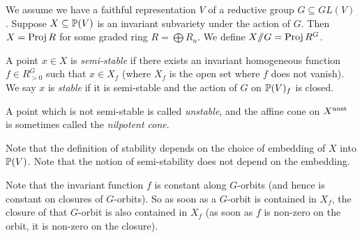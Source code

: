 
We assume we have a faithful representation $V$ of a reductive group $G\subseteq GL(V)$. Suppose $X\subseteq \mathbb{P}(V)$ is an invariant subvariety under the action of $G$. Then $X=\operatorname{Proj} R$ for some graded ring $R=\bigoplus R_n$. We define $X\mbox{\rm /\!\!/} G = \operatorname{Proj} R^G$.

\begin{definition}
 A point $x\in X$ is \emph{semi-stable} if there exists an invariant homogeneous function $f\in R_{>0}^G$ such that $x\in X_f$ (where $X_f$ is the open set where $f$ does not vanish). We say $x$ is \emph{stable} if it is semi-stable and the action of $G$ on $\mathbb{P}(V)_f$ is closed.
 
 A point which is not semi-stable is called \emph{unstable}, and the affine cone on $X^{\mathrm{unst}}$ is sometimes called the \emph{nilpotent cone}.
\end{definition}
\begin{remark}
 Note that the definition of stability depends on the choice of embedding of $X$ into $\mathbb{P}(V)$.  Note that the notion of semi-stability does not depend on the embedding.
\end{remark}
\begin{remark}
 Note that the invariant function $f$ is constant along $G$-orbits (and hence is constant on closures of $G$-orbits). So as soon as a $G$-orbit is contained in $X_f$, the closure of that $G$-orbit is also contained in $X_f$ (as soon as $f$ is non-zero on the orbit, it is non-zero on the closure).
\end{remark}


%  


